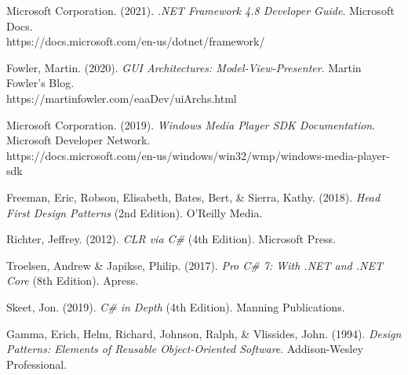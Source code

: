 \documentclass[a4paper]{article}
\begin{document}
\begin{thebibliography}{9}

Microsoft Corporation. (2021). \textit{.NET Framework 4.8 Developer Guide}. Microsoft Docs. \\
https://docs.microsoft.com/en-us/dotnet/framework/

Fowler, Martin. (2020). \textit{GUI Architectures: Model-View-Presenter}. Martin Fowler's Blog. \\
https://martinfowler.com/eaaDev/uiArchs.html

Microsoft Corporation. (2019). \textit{Windows Media Player SDK Documentation}. Microsoft Developer Network. \\
https://docs.microsoft.com/en-us/windows/win32/wmp/windows-media-player-sdk

Freeman, Eric, Robson, Elisabeth, Bates, Bert, \& Sierra, Kathy. (2018). \textit{Head First Design Patterns} (2nd Edition). O'Reilly Media.

Richter, Jeffrey. (2012). \textit{CLR via C\#} (4th Edition). Microsoft Press.

Troelsen, Andrew \& Japikse, Philip. (2017). \textit{Pro C\# 7: With .NET and .NET Core} (8th Edition). Apress.

Skeet, Jon. (2019). \textit{C\# in Depth} (4th Edition). Manning Publications.

Gamma, Erich, Helm, Richard, Johnson, Ralph, \& Vlissides, John. (1994). \textit{Design Patterns: Elements of Reusable Object-Oriented Software}. Addison-Wesley Professional.

\end{thebibliography}
\end{document}
